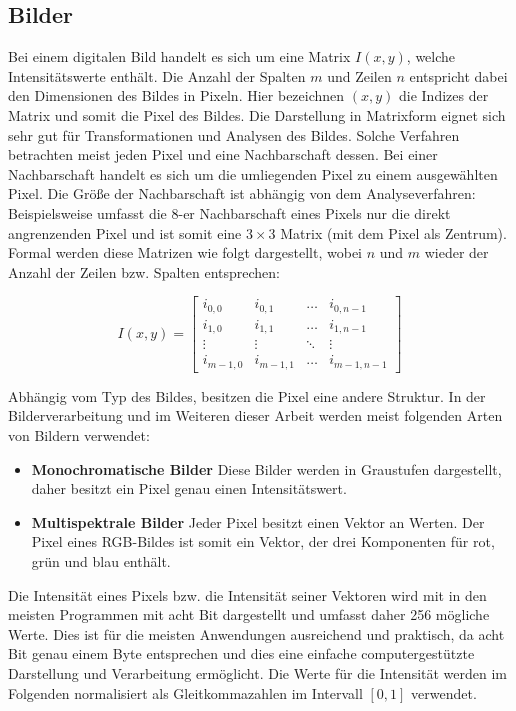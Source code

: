 \subsection{Bilder}

Bei einem digitalen Bild handelt es sich um eine Matrix $I(x, y)$, welche Intensitätswerte enthält. Die Anzahl der Spalten $m$ und Zeilen $n$ entspricht dabei den Dimensionen des Bildes in Pixeln. Hier bezeichnen $(x, y)$ die Indizes der Matrix und somit die Pixel des Bildes. Die Darstellung in Matrixform eignet sich  sehr gut für Transformationen und Analysen des Bildes. Solche Verfahren betrachten meist jeden Pixel und eine Nachbarschaft dessen. Bei einer Nachbarschaft handelt es sich um die umliegenden Pixel zu einem ausgewählten Pixel. Die Größe der Nachbarschaft ist abhängig von dem Analyseverfahren: Beispielsweise umfasst die 8-er Nachbarschaft eines Pixels nur die direkt angrenzenden Pixel und ist somit eine $3 \times 3$ Matrix (mit dem Pixel als Zentrum). Formal werden diese Matrizen wie folgt dargestellt, wobei $n$ und $m$ wieder der Anzahl der Zeilen bzw. Spalten entsprechen:

$$
I(x, y) = \begin{bmatrix}
i_{0, 0}   & i_{0, 1}	& \dots	 & i_{0, n-1}   \\
i_{1, 0}   & i_{1, 1}   & \dots  & i_{1, n-1}   \\
\vdots	   & \vdots 	& \ddots & \vdots       \\
i_{m-1, 0} & i_{m-1, 1} & \dots	 & i_{m-1, n-1}
\end{bmatrix}
$$ 

Abhängig vom Typ des Bildes, besitzen die Pixel eine andere Struktur. In der Bilderverarbeitung und im Weiteren dieser Arbeit werden meist folgenden Arten von Bildern verwendet:

\begin{itemize}
	\item \textbf{Monochromatische Bilder} Diese Bilder werden in Graustufen dargestellt, daher besitzt ein Pixel genau einen Intensitätswert.
	\item \textbf{Multispektrale Bilder} Jeder Pixel besitzt einen Vektor an Werten. Der Pixel eines RGB-Bildes ist somit ein Vektor, der drei Komponenten für  rot, grün und blau enthält.
\end{itemize}

Die Intensität eines Pixels bzw. die Intensität seiner Vektoren wird mit in den meisten Programmen mit acht Bit dargestellt und umfasst daher 256 mögliche Werte. Dies ist für die meisten Anwendungen ausreichend und praktisch, da acht Bit genau einem Byte entsprechen und dies eine einfache computergestützte Darstellung und Verarbeitung ermöglicht. Die Werte für die Intensität werden im Folgenden normalisiert als Gleitkommazahlen im Intervall $[0, 1]$ verwendet.

